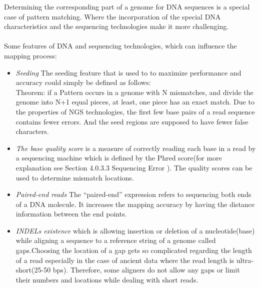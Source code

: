 \documentclass[11pt,a4paper]{report}
\newcommand{\quotes}[1]{``#1''}
\begin{document}
Determining the corresponding part of a genome for DNA sequences is a special case of pattern matching.
Where the incorporation of the special DNA characteristics and the sequencing technologies make it more challenging.
\\\\
Some features of DNA and sequencing technologies, which can influence the mapping process:
\begin{itemize} 
 \item \emph{Seeding}
The seeding feature that is used to to maximize performance and accuracy could simply be defined as follows:\\
Theorem: if a Pattern occurs in a genome with N mismatches, and divide the genome into N+1 equal pieces, at least, one piece has an exact match. 
Due to the properties of NGS technologies, the first few base pairs of a read sequence contains fewer errors. And the seed regions are supposed to have fewer false characters.

 \item \emph{The base quality score} is a measure of correctly reading each base in a read by a sequencing machine which is defined by the Phred score(for more explanation see Section 4.0.3.3 Sequencing Error ).
The quality scores can be used to determine mismatch locations.



 \item \emph{Paired-end reads}
The \quotes{paired-end} expression refers to sequencing both ends of a DNA molecule.
It increases the mapping accuracy by having the distance information
 between the end points.
 
 \item \emph{INDELs existence}  which is allowing insertion or deletion of a nucleotide(base) while aligning a sequence to a reference string of a genome called gaps.Choosing the location of a gap gets so complicated regarding the length of a read especially in the case of ancient data where the read length is ultra-short(25-50 bps). Therefore, some aligners do not allow any gaps or limit their numbers and locations while dealing with short reads.
 
\end{itemize}
\end{document}
